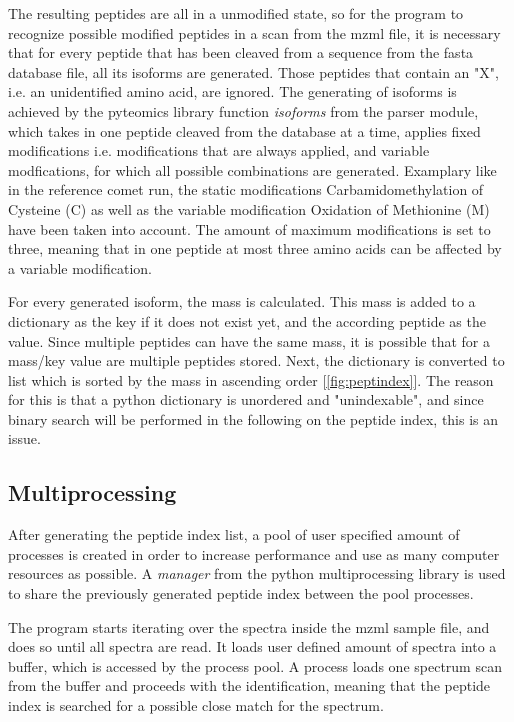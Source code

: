 \documentclass[11pt]{article}
\begin{document}
The resulting peptides are all in a unmodified state, so for the program to recognize possible modified peptides in a scan from the mzml file, it is necessary that for every peptide that has been cleaved from a sequence from the fasta database file, all its isoforms are generated. Those peptides that contain an "X", i.e. an unidentified amino acid, are ignored. The generating of isoforms is achieved by the pyteomics library function \textit{isoforms} from the parser module, which takes in one peptide cleaved from the database at a time, applies fixed modifications i.e. modifications that are always applied, and variable modfications, for which all possible combinations are generated. Examplary like in the reference comet run, the static modifications Carbamidomethylation of Cysteine (C) as well as the variable modification Oxidation of Methionine (M) have been taken into account. The amount of maximum modifications is set to three, meaning that in one peptide at most three amino acids can be affected by a variable modification.

For every generated isoform, the mass is calculated. This mass is added to a dictionary as the key if it does not exist yet, and the according peptide as the value. Since multiple peptides can have the same mass, it is possible that for a mass/key value are multiple peptides stored. Next, the dictionary is converted to list which is sorted by the mass in ascending order [\cref{fig:peptindex}]. The reason for this is that a python dictionary is unordered and "unindexable", and since binary search will be performed in the following on the peptide index, this is an issue.
 
\subsection{Multiprocessing}
After generating the peptide index list, a pool of user specified amount of processes is created in order to increase performance and use as many computer resources as possible. A \textit{manager} from the python multiprocessing library is used to share the previously generated peptide index between the pool processes. 

The program starts iterating over the spectra inside the mzml sample file, and does so until all spectra are read. It loads user defined amount of spectra into a buffer, which is accessed by the process pool. A process loads one spectrum scan from the buffer and proceeds with the identification, meaning that the peptide index is searched for a possible close match for the spectrum.
\end{document}
